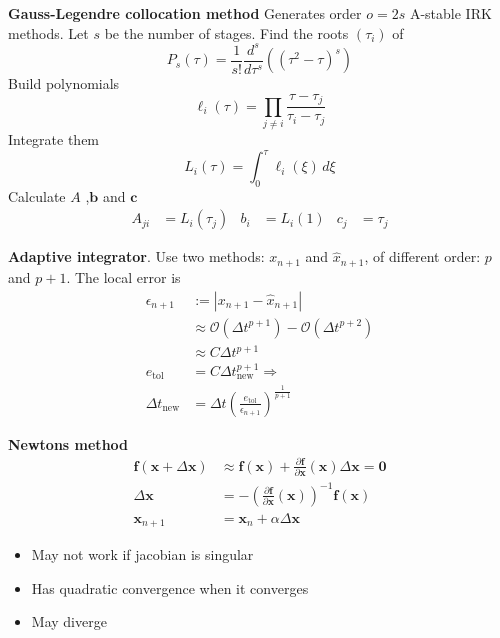 \textbf{Gauss-Legendre collocation method}
Generates order \(o=2s\) A-stable IRK methods. Let \(s\) be the number of stages. Find the roots \((\tau_i)\) of 
\[P_s(\tau)=\frac{1}{s!}\frac{d^s}{d\tau^s}\left((\tau^2-\tau)^s\right)\]
Build polynomials
\[\ell_i(\tau) = \prod_{j\neq i}\frac{\tau-\tau_j}{\tau_i-\tau_j}\]
Integrate them
\[L_i(\tau) = \int_0^\tau\ell_i(\xi)\,d\xi\]
Calculate \(A\) ,\(\bm{b}\) and \(\bm{c}\)
\begin{align*}
    A_{ji} &= L_i(\tau_j) & b_i &= L_i(1) & c_j &=  \tau_j
\end{align*}

\textbf{Adaptive integrator}. 
Use two methods: \(x_{n+1}\) and \(\hat{x}_{n+1}\), of different order: \(p\) and \(p+1\). The local error is
\begin{align*}
    \epsilon_{n+1} &:= |x_{n+1}-\hat{x}_{n+1}| \\
    &\approx \mathcal{O}(\Delta t^{p+1})- \mathcal{O}(\Delta t^{p+2}) \\ 
    &\approx C\Delta t^{p+1} \\
    e_{\textrm{tol}} &=  C\Delta t^{p+1}_{\textrm{new}} \Rightarrow \\
    \Delta t_{\textrm{new}} &= \Delta t \left(\frac{e_{\textrm{tol}}}{\epsilon_{n+1}}\right)^{\frac{1}{p+1}}
\end{align*}

\textbf{Newtons method}
\begin{align*}
    \bm{f}(\bm{x}+\Delta \bm{x}) &\approx  \bm{f}(\bm{x}) + \frac{\partial \bm{f}}{\partial \bm{x}}(\bm{x})\Delta \bm{x}  = \bm{0} \\
    \Delta \bm{x} &= - \left(\frac{\partial \bm{f}}{\partial \bm{x}}(\bm{x})\right)^{-1}\bm{f}(\bm{x}) \\
    \bm{x}_{n+1} &= \bm{x}_n + \alpha \Delta \bm{x}
\end{align*}
\begin{itemize}
    \item May not work if jacobian is singular
    \item Has quadratic convergence when it converges
    \item May diverge
\end{itemize}

